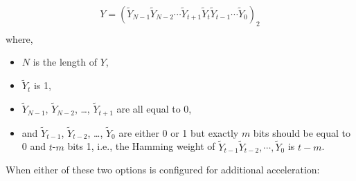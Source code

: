 \documentclass[main\_\_EN.tex]{subfiles}
\begin{document}
\begin{gather*}
Y = ( \widetilde{Y}_{N-1} \widetilde{Y}_{N-2} \cdots \widetilde{Y}_{t+1} \widetilde{Y}_{t} \widetilde{Y}_{t-1} \cdots \widetilde{Y}_{0} )_{2} \\
\end{gather*}
where,
\begin{itemize}
    \item \begin{math} N \end{math} is the length of \begin{math}Y \end{math},
    \item \begin{math}\widetilde{Y}_{t}\end{math} is 1,
    \item \begin{math}\widetilde{Y}_{N-1}\end{math}, \begin{math}\widetilde{Y}_{N-2}\end{math}, \dots, \begin{math}\widetilde{Y}_{t+1}\end{math} are all equal to 0,
    \item and \begin{math}\widetilde{Y}_{t-1}\end{math}, \begin{math}\widetilde{Y}_{t-2}\end{math}, \dots, \begin{math}\widetilde{Y}_{0}\end{math} are either 0 or 1 but exactly \begin{math}m\end{math} bits should be equal to 0 and \begin{math}t\end{math}-\begin{math}m\end{math} bits 1, i.e., the Hamming weight of \begin{math}\widetilde{Y}_{t-1} \widetilde{Y}_{t-2}, \cdots, \widetilde{Y}_{0}\end{math} is \begin{math}t -m\end{math}.
\end{itemize}

When either of these two options is configured for additional acceleration:
\end{document}
